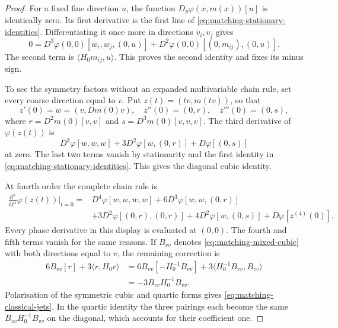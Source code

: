 \documentclass[11pt,reqno]{amsart}
\numberwithin{equation}{section}
\theoremstyle{definition}
\theoremstyle{remark}
\newcommand{\dd}{\mathrm d}
\begin{document}
\begin{proof}
For a fixed fine direction \(u\), the function
\(D_y\varphi(x,m(x))[u]\) is identically zero.
Its first derivative is the first line of
\eqref{eq:matching-stationary-identities}.
Differentiating it once more in directions \(v_i,v_j\)
gives
\[
 0=D^3\varphi(0,0)[w_i,w_j,(0,u)]
             +D^2\varphi(0,0)[(0,m_{ij}),(0,u)].
\]
The second term is \(\langle H_0m_{ij},u\rangle\).
This proves the second identity and fixes its minus sign.

To see the symmetry factors without an expanded multivariable
chain rule, set every coarse direction equal to \(v\).
Put \(z(t)=(tv,m(tv))\), so that
\[
 z'(0)=w=(v,Dm(0)v),\quad
 z''(0)=(0,r),\quad z'''(0)=(0,s),
\]
where \(r=D^2m(0)[v,v]\) and
\(s=D^3m(0)[v,v,v]\).
The third derivative of \(\varphi(z(t))\) is
\[
 D^3\varphi[w,w,w]
       +3D^2\varphi[w,(0,r)]
       +D\varphi[(0,s)]
\]
at zero. The last two terms vanish by stationarity and
the first identity in
\eqref{eq:matching-stationary-identities}.
This gives the diagonal cubic identity.

At fourth order the complete chain rule is
\[
 \begin{split}
 \frac{\dd^4}{\dd t^4}\varphi(z(t))\big|_{t=0}
  ={}&D^4\varphi[w,w,w,w]
        +6D^3\varphi[w,w,(0,r)]\\
    &+3D^2\varphi[(0,r),(0,r)]
        +4D^2\varphi[w,(0,s)]
        +D\varphi[z^{(4)}(0)].
 \end{split}
\]
Every phase derivative in this display is evaluated at
\((0,0)\). The fourth and fifth terms vanish for the
same reasons. If \(B_{vv}\) denotes
\eqref{eq:matching-mixed-cubic} with both directions
equal to \(v\), the remaining correction is
\[
 \begin{split}
 6B_{vv}[r]+3\langle r,H_0r\rangle
 &=6B_{vv}[-H_0^{-1}B_{vv}]
            +3\langle H_0^{-1}B_{vv},B_{vv}\rangle\\
 &=-3B_{vv}H_0^{-1}B_{vv}.
 \end{split}
\]
Polarisation of the symmetric cubic and quartic forms
gives \eqref{eq:matching-classical-jets}. In the quartic
identity the three pairings each become the same
\(B_{vv}H_0^{-1}B_{vv}\) on the diagonal, which accounts
for their coefficient one.
\end{proof}
\end{document}
